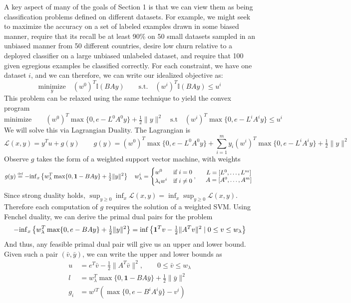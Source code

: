 \begin{example}
\noindent
A key aspect of many of the goals of Section 1 is that we can view them as
being classification  problems defined on different datasets. For example, we
might seek to maximize the accuracy on a set of labeled examples drawn in some
biased manner, require that its recall be at least 90\% on 50 small datasets
sampled in an unbiased manner from 50 different countries, desire low churn
relative to a deployed classifier on a large unbiased unlabeled dataset, and
require that 100 given egregious examples be classified correctly. For each
constraint, we have one dataset $i$, and we can therefore, we can write our
idealized objective as:
\[
\underset{y}{\mbox{minimize}}\quad (w^0)^{T}\mathbb{I}(BAy) \qquad \mbox{s.t.}\quad (w^i)^{T}\mathbb{I}(BAy) \leq u^i
\]
This problem can be relaxed using the same technique to yield the convex program
\[
 \mbox{minimize} \qquad (w^{0})^{T}\max\{0,e-L^{0}A^{0}y\}+\tfrac{1}{2}\|y\|^{2} \quad \mbox{s.t} \quad (w^{i})^{T}\max\{0,e-L^{i}A^{i}y\}\leq u^{i}
\]
We will solve this via Lagrangian Duality. The Lagrangian is
$$
\mathcal{L}(x,y)=y^{T}u+g(y)\qquad g(y)=(w^{0})^{T}\!\max\{0,e-L^{0}A^{0}y\}+{\textstyle \sum_{i=1}^{m}}y_{i}(w^{i})^{T}\!\max\{0,e-L^{i}A^{i}y\}+\tfrac{1}{2}\|y\|^{2}
$$
Observe $g$ takes the form of a weighted support vector machine, with weights
\[
g(y)\overset{\mbox{\tiny def}}{=}-\mbox{\ensuremath{\inf}}_{x}\left\{ w_{\lambda}^{T}\max\{0,\mathbf{1}-BAy\}+\tfrac{1}{2}\|y\|^{2}\right\} \quad 
w_{\lambda}^{i}=\begin{cases}
w^{0} & \mbox{if \ensuremath{i=0}}\\
\lambda_{i}w^{i} & \mbox{if \ensuremath{i\neq0}}
\end{cases},\quad 
\begin{array}{c}
L=[L^{0},\dots,L^{m}]\\
A=[A^{0},\dots,A^{m}]
\end{array}
\]
Since strong duality holds, $\sup_{y\geq0}\inf_{x}\mathcal{L}(x,y)=\inf_{x}\sup_{y\geq0}\mathcal{L}(x,y)$. Therefore each computation of $g$ requires the solution of a weighted SVM.
Using Fenchel duality, we can derive the primal dual pairs for the
problem
\begin{equation}\label{eq:svm-dual-form}
-\mbox{\ensuremath{\inf}}_{x}\left\{ w_{\lambda}^{T}\max\{0,e-BAy\}+\tfrac{1}{2}\|y\|^{2}\right\} =\inf\left\{ \mathbf{1}^{T}v-\tfrac{1}{2}\|A^{T}v\|^{2}\mid0\leq v\leq w_{\lambda}\right\} 
\end{equation}
And thus, any feasible primal dual pair will give us an upper and
lower bound. Given such a pair $(\bar{v},\bar{y})$, we can write the upper and
lower bounds as
\begin{align*}
u & =e^{T}\bar{v}-\tfrac{1}{2}\|A^{T}\bar{v}\|^{2},\qquad0\leq\bar{{v}}\leq w_{\lambda}\\
l & =w_{\lambda}^{T}\max\{0,\mathbf{1}-BA\bar{y}\}+\tfrac{1}{2}\|\bar{y}\|^{2}\\
g_{i} & =w^{iT}(\max\{0,e-B^{i}A^{i}\bar{y}\}-v^{i})
\end{align*}

\end{example}

